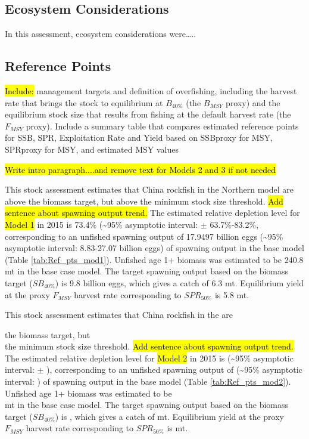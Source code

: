 \documentclass[12pt,]{article}
\begin{document}
\FloatBarrier

\subsection*{Ecosystem Considerations}\label{ecosystem-considerations}

In this assessment, ecosystem considerations were\ldots{}..

\subsection*{Reference Points}\label{reference-points}

\hl{Include:} management targets and definition of overfishing,
including the harvest rate that brings the stock to equilibrium at
\(B_{40\%}\) (the \(B_{MSY}\) proxy) and the equilibrium stock size that
results from fishing at the default harvest rate (the \(F_{MSY}\)
proxy). Include a summary table that compares estimated reference points
for SSB, SPR, Exploitation Rate and Yield based on SSBproxy for MSY,
SPRproxy for MSY, and estimated MSY values

\hl{Write intro paragraph....and remove text for Models 2 and 3 if not needed}

This stock assessment estimates that China rockfish in the Northern
model are above the biomass target, but above the minimum stock size
threshold. \hl{Add sentence about spawning output trend.} The estimated
relative depletion level for \hl{Model 1} in 2015 is 73.4\%
(\textasciitilde{}95\% asymptotic interval: \(\pm\) 63.7\%-83.2\%,
corresponding to an unfished spawning output of 17.9497 billion eggs
(\textasciitilde{}95\% asymptotic interval: 8.83-27.07 billion eggs) of
spawning output in the base model (Table \ref{tab:Ref_pts_mod1}).
Unfished age 1+ biomass was estimated to be 240.8 mt in the base case
model. The target spawning output based on the biomass target
(\(SB_{40\%}\)) is 9.8 billion eggs, which gives a catch of 6.3 mt.
Equilibrium yield at the proxy \(F_{MSY}\) harvest rate corresponding to
\(SPR_{50\%}\) is 5.8 mt.

This stock assessment estimates that China rockfish in the are

the biomass target, but\\
the minimum stock size threshold.
\hl{Add sentence about spawning output trend.} The estimated relative
depletion level for \hl{Model 2} in 2015 is (\textasciitilde{}95\%
asymptotic interval: \(\pm\) ), corresponding to an unfished spawning
output of (\textasciitilde{}95\% asymptotic interval: ) of spawning
output in the base model (Table \ref{tab:Ref_pts_mod2}). Unfished age 1+
biomass was estimated to be\\
mt in the base case model. The target spawning output based on the
biomass target (\(SB_{40\%}\)) is , which gives a catch of mt.
Equilibrium yield at the proxy \(F_{MSY}\) harvest rate corresponding to
\(SPR_{50\%}\) is mt.
\end{document}
